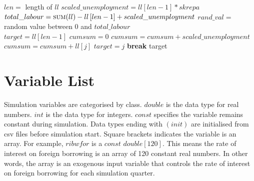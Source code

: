 \documentclass{article}
\begin{document}
\begin{algorithm}[H]
\caption{Choose Labour Target}
    \begin{algorithmic}
        \State $len = $ length of $ll$ 
        \State $scaled\_unemployment = ll\left[len - 1\right] * skrepa$
        \State $total\_labour = \Call{sum}{ll} - ll\left[len - 1\right] + scaled\_unemployment$
        \State $rand\_val = $ random value between $0$ and $total\_labour$
        \\
        \State $target = ll\left[len - 1\right]$ 
        \State $cumsum = 0$
        \State $cumsum = cumsum + scaled\_unemployment$
        \Else
        \State $cumsum = cumsum + ll\left[j\right]$
        \EndIf
        \State $target = j$
        \State \textbf{break}
        \EndIf
        \EndFor
        \State \Return target
        \EndFunction
    \end{algorithmic}
\end{algorithm}

\clearpage
\listofalgorithms

\clearpage
\section{Variable List}

Simulation variables are categorised by class. $double$ is the data type for real numbers. $int$ is the data type for integers. $const$ specifies the variable remains constant during simulation. Data types ending with $(init)$ are initialised from csv files before simulation start. Square brackets indicates the variable is an array. For example, $ribwfor$ is a $const$ $double\left[120\right]$. This means the rate of interest on foreign borrowing is an array of 120 constant real numbers. In other words, the array is an exogenous input variable that controls the rate of interest on foreign borrowing for each simulation quarter.
\end{document}
